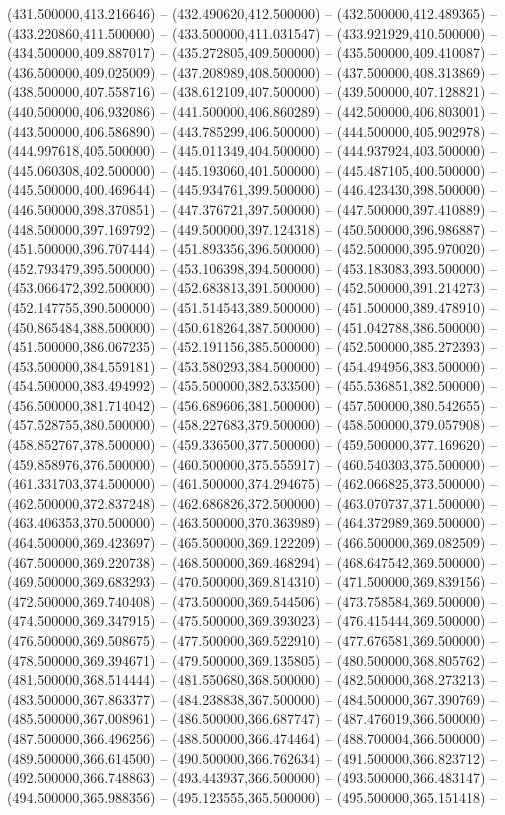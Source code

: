 (431.500000,413.216646) -- (432.490620,412.500000) -- (432.500000,412.489365) -- (433.220860,411.500000) -- (433.500000,411.031547) -- (433.921929,410.500000) -- (434.500000,409.887017) -- (435.272805,409.500000) -- (435.500000,409.410087) -- (436.500000,409.025009) -- (437.208989,408.500000) -- (437.500000,408.313869) -- (438.500000,407.558716) -- (438.612109,407.500000) -- (439.500000,407.128821) -- (440.500000,406.932086) -- (441.500000,406.860289) -- (442.500000,406.803001) -- (443.500000,406.586890) -- (443.785299,406.500000) -- (444.500000,405.902978) -- (444.997618,405.500000) -- (445.011349,404.500000) -- (444.937924,403.500000) -- (445.060308,402.500000) -- (445.193060,401.500000) -- (445.487105,400.500000) -- (445.500000,400.469644) -- (445.934761,399.500000) -- (446.423430,398.500000) -- (446.500000,398.370851) -- (447.376721,397.500000) -- (447.500000,397.410889) -- (448.500000,397.169792) -- (449.500000,397.124318) -- (450.500000,396.986887) -- (451.500000,396.707444) -- (451.893356,396.500000) -- (452.500000,395.970020) -- (452.793479,395.500000) -- (453.106398,394.500000) -- (453.183083,393.500000) -- (453.066472,392.500000) -- (452.683813,391.500000) -- (452.500000,391.214273) -- (452.147755,390.500000) -- (451.514543,389.500000) -- (451.500000,389.478910) -- (450.865484,388.500000) -- (450.618264,387.500000) -- (451.042788,386.500000) -- (451.500000,386.067235) -- (452.191156,385.500000) -- (452.500000,385.272393) -- (453.500000,384.559181) -- (453.580293,384.500000) -- (454.494956,383.500000) -- (454.500000,383.494992) -- (455.500000,382.533500) -- (455.536851,382.500000) -- (456.500000,381.714042) -- (456.689606,381.500000) -- (457.500000,380.542655) -- (457.528755,380.500000) -- (458.227683,379.500000) -- (458.500000,379.057908) -- (458.852767,378.500000) -- (459.336500,377.500000) -- (459.500000,377.169620) -- (459.858976,376.500000) -- (460.500000,375.555917) -- (460.540303,375.500000) -- (461.331703,374.500000) -- (461.500000,374.294675) -- (462.066825,373.500000) -- (462.500000,372.837248) -- (462.686826,372.500000) -- (463.070737,371.500000) -- (463.406353,370.500000) -- (463.500000,370.363989) -- (464.372989,369.500000) -- (464.500000,369.423697) -- (465.500000,369.122209) -- (466.500000,369.082509) -- (467.500000,369.220738) -- (468.500000,369.468294) -- (468.647542,369.500000) -- (469.500000,369.683293) -- (470.500000,369.814310) -- (471.500000,369.839156) -- (472.500000,369.740408) -- (473.500000,369.544506) -- (473.758584,369.500000) -- (474.500000,369.347915) -- (475.500000,369.393023) -- (476.415444,369.500000) -- (476.500000,369.508675) -- (477.500000,369.522910) -- (477.676581,369.500000) -- (478.500000,369.394671) -- (479.500000,369.135805) -- (480.500000,368.805762) -- (481.500000,368.514444) -- (481.550680,368.500000) -- (482.500000,368.273213) -- (483.500000,367.863377) -- (484.238838,367.500000) -- (484.500000,367.390769) -- (485.500000,367.008961) -- (486.500000,366.687747) -- (487.476019,366.500000) -- (487.500000,366.496256) -- (488.500000,366.474464) -- (488.700004,366.500000) -- (489.500000,366.614500) -- (490.500000,366.762634) -- (491.500000,366.823712) -- (492.500000,366.748863) -- (493.443937,366.500000) -- (493.500000,366.483147) -- (494.500000,365.988356) -- (495.123555,365.500000) -- (495.500000,365.151418) -- 